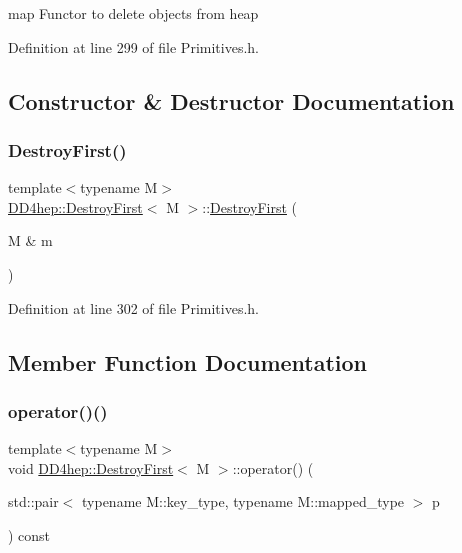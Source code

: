 map Functor to delete objects from heap 

Definition at line 299 of file Primitives.\+h.



\subsection{Constructor \& Destructor Documentation}
\hypertarget{class_d_d4hep_1_1_destroy_first_a2ab7069ab1062311f4ad6e7c5e93d340}{}\label{class_d_d4hep_1_1_destroy_first_a2ab7069ab1062311f4ad6e7c5e93d340} 
\subsubsection{\texorpdfstring{Destroy\+First()}{DestroyFirst()}}
{\footnotesize\ttfamily template$<$typename M$>$ \\
\hyperlink{class_d_d4hep_1_1_destroy_first}{D\+D4hep\+::\+Destroy\+First}$<$ M $>$\+::\hyperlink{class_d_d4hep_1_1_destroy_first}{Destroy\+First} (\begin{DoxyParamCaption}\item[{M \&}]{m }\end{DoxyParamCaption})\hspace{0.3cm}{\ttfamily [inline]}}



Definition at line 302 of file Primitives.\+h.



\subsection{Member Function Documentation}
\hypertarget{class_d_d4hep_1_1_destroy_first_a77c70c358c4ff98adb3dd9f3eeb8cbdd}{}\label{class_d_d4hep_1_1_destroy_first_a77c70c358c4ff98adb3dd9f3eeb8cbdd} 
\subsubsection{\texorpdfstring{operator()()}{operator()()}\hspace{0.1cm}{\footnotesize\ttfamily [1/2]}}
{\footnotesize\ttfamily template$<$typename M$>$ \\
void \hyperlink{class_d_d4hep_1_1_destroy_first}{D\+D4hep\+::\+Destroy\+First}$<$ M $>$\+::operator() (\begin{DoxyParamCaption}\item[{std\+::pair$<$ typename M\+::key\+\_\+type, typename M\+::mapped\+\_\+type $>$}]{p }\end{DoxyParamCaption}) const\hspace{0.3cm}{\ttfamily [inline]}}



